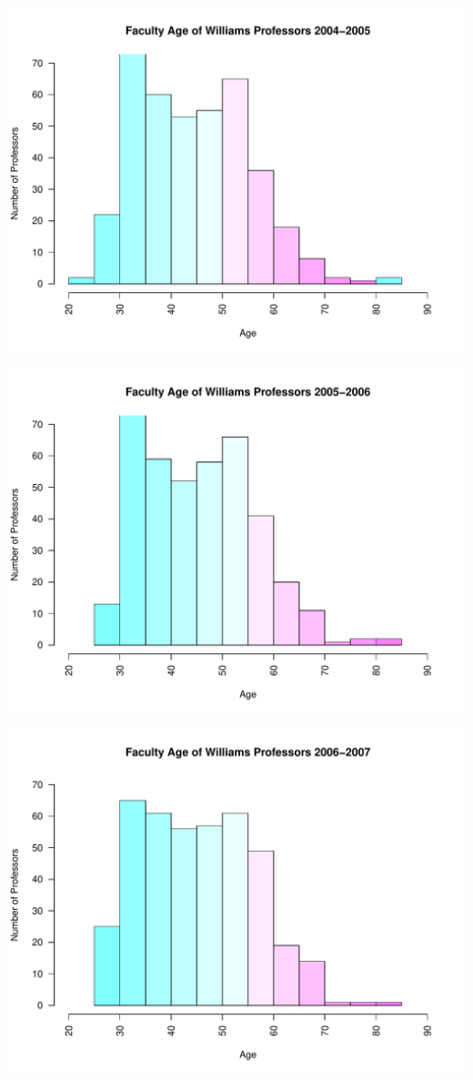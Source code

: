\documentclass[12pt,a4paper]{article}\usepackage[]{graphicx}\usepackage[]{color}
\makeatletter
\def\maxwidth{ %
  \ifdim\Gin@nat@width>\linewidth
    \linewidth
  \else
    \Gin@nat@width
  \fi
}
\newenvironment{knitrout}{}{} %
\theoremstyle{definition}
\makeatother
\begin{document}
\begin{knitrout}
\color{fgcolor}
\includegraphics[width=\maxwidth]{figure/unnamed-chunk-9-1} 

\includegraphics[width=\maxwidth]{figure/unnamed-chunk-9-2} 

\includegraphics[width=\maxwidth]{figure/unnamed-chunk-9-3} 


\end{knitrout}
\end{document}
